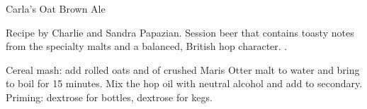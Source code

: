 \begin{recipe}{Carla's Oat Brown Ale} %

\begin{aboutblock}
Recipe by Charlie and Sandra Papazian. Session beer that contains toasty notes
from the specialty malts and a balanced, British hop character.
.
\end{aboutblock}


\begin{methodandtiming}

\begin{mashsteps}
\end{mashsteps}

\begin{fermentationsteps}
\end{fermentationsteps}

\begin{directions}
Cereal mash: add rolled oats and  of crushed Maris Otter malt
to  water and bring to boil for 15 minutes. Mix the hop oil with
 neutral alcohol and add to secondary. Priming:
 dextrose for bottles, 
dextrose for kegs.
\end{directions}

\end{methodandtiming}

\recipebreak

\begin{ingredientsblock}

\begin{malts}
\end{malts}

\begin{hops}
\end{hops}


\end{ingredientsblock}

\end{recipe}

